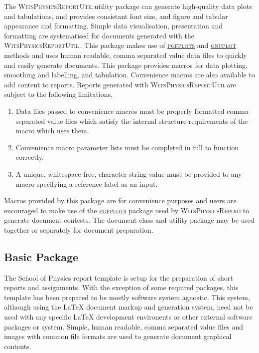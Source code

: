 \documentclass[10pt, a4paper, oneside]{article}
\newcommand{\WitsPhysicsReport}{\textrm{\textsc{WitsPhysicsReport}}\,}
\newcommand{\WitsPhysicsReportUtil}{\textrm{\textsc{WitsPhysicsReportUtil}}\,}
\newcommand{\pgfplots}{\href{http://pgfplots.sourceforge.net}{\textsc{pgfplots}} \index{\textsc{pgfplots}}}
\newcommand{\gnuplot}{\href{http://www.gnuplot.info}{\textsc{gnuplot}} \index{\textsc{gnuplot}}}
\begin{document}
\par{The \WitsPhysicsReportUtil utility package can generate high-quality data plots and tabulations, and provides consistant font size, and figure and tabular appearance and formatting. Simple data visualisation, presentation and formatting are systematised for documents generated with the \\ \WitsPhysicsReportUtil. This package makes use of \pgfplots and \gnuplot methods and uses human readable, comma separated value data files to quickly and easily generate documents. This package provides macros for data plotting, smoothing and labelling, and tabulation. Convenience macros are also available to add content to reports. Reports generated with \WitsPhysicsReportUtil are subject to the following limitations,
    \begin{enumerate}
        \item{Data files passed to convenience macros must be properly formatted comma separated value files which satisfy the internal structure requirements of the macro which uses them.}
        \item{Convenience macro parameter lists must be completed in full to function correctly.}
        \item{A unique, whitespace free, character string value must be provided to any macro specifying a reference label as an input.}
    \end{enumerate}
Macros provided by this package are for convenience purposes and users are encouraged to make use of the \pgfplots package used by \WitsPhysicsReport to generate document contests. The document class and utility package may be used together or separately for document preparation.}

\subsection{Basic Package}
\label{sec:Basic_Package}

\par{The School of Physics report template is setup for the preparation of short reports and assignments.  With the exception of some required packages, this template has been prepared to be mostly software system agnostic. This system, although using the \LaTeX{} document markup and generation system, need not be used with any specific \LaTeX{} development environents or other external software packages or system.  Simple, human readable, comma separated value files and images with common file formats are used to generate document graphical contents.}
\end{document}
